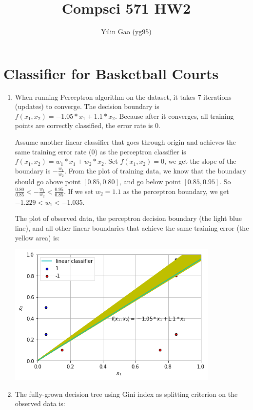 \documentclass[paper=letter, fontsize=12pt]{article}
\title{Compsci 571 HW2}
\author{Yilin Gao (yg95)}
\begin{document}
\maketitle
\section{Classifier for Basketball Courts}

\begin{enumerate}[label=(\alph*)]
	\item When running Perceptron algorithm on the dataset, it takes 7 iterations (updates) to converge. The decision boundary is $f(x_1, x_2) = -1.05 * x_1 + 1.1 * x_2$. Because after it converges, all training points are correctly classified, the error rate is 0.
	
	Assume another linear classifier that goes through origin and achieves the same training error rate (0) as the perceptron classifier is $f(x_1, x_2) = w_1 * x_1 + w_2 * x_2$. Set $f(x_1, x_2) = 0$, we get the slope of the boundary is $-\frac{w_1}{w_2}$. From the plot of training data, we know that the boundary should go above point $[0.85, 0.80]$, and go below point $[0.85, 0.95]$. So $\frac{0.80}{0.85} < -\frac{w_1}{w_2} < \frac{0.95}{0.85}$. If we set $w_2 = 1.1$ as the perceptron boundary, we get $-1.229 < w_1 < -1.035$.
	
	The plot of observed data, the perceptron decision boundary (the light blue line), and all other linear boundaries that achieve the same training error (the yellow area) is:
	
	\includegraphics[scale=0.6]{q1a.png}
	
	\item The fully-grown decision tree using Gini index as splitting criterion on the observed data is:
	

\end{enumerate}
\end{document}
